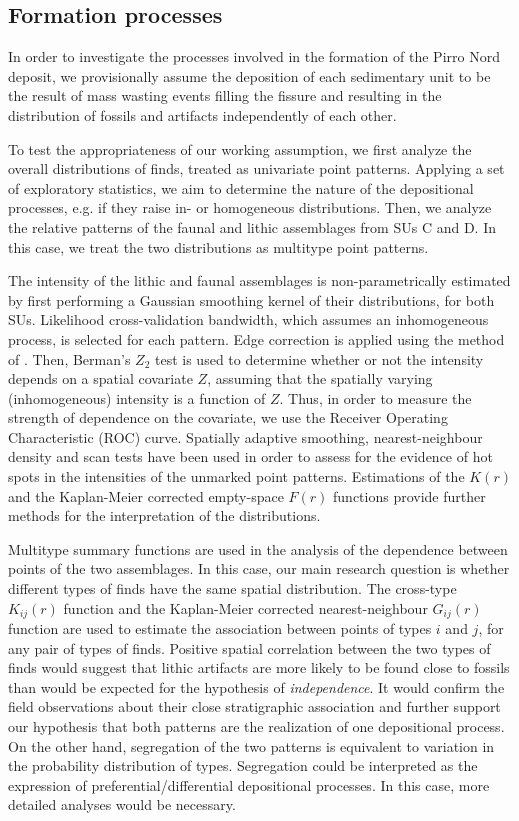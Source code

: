 \documentclass[5p,authoryear]{elsarticle} %
\begin{document}
\subsection{Formation processes}

In order to investigate the processes involved in the formation of the Pirro Nord deposit, we provisionally assume the deposition of each sedimentary unit to be the result of mass wasting events filling the fissure and resulting in the distribution of fossils and artifacts independently of each other.

To test the appropriateness of our working assumption, we first analyze the overall distributions of finds, treated as univariate point patterns. Applying a set of exploratory statistics, we aim to determine the nature of the depositional processes, e.g. if they raise in- or homogeneous distributions. Then, we analyze the relative patterns of the faunal and lithic assemblages from SUs C and D. In this case, we treat the two distributions as multitype point patterns.

The intensity of the lithic and faunal assemblages is non-parametrically estimated by first performing a Gaussian smoothing kernel of their distributions, for both SUs. Likelihood cross-validation bandwidth, which assumes an inhomogeneous process, is selected for each pattern. Edge correction is applied using the method of \cite{Diggle1985}. Then, Berman's $Z_2$ test is used to determine whether or not the intensity depends on a spatial covariate $Z$, assuming that the spatially varying (inhomogeneous) intensity is a function of $Z$. Thus, in order to measure the strength of dependence on the covariate, we use the Receiver Operating Characteristic (ROC) curve. Spatially adaptive smoothing, nearest-neighbour density and scan tests have been used in order to assess for the evidence of hot spots in the intensities of the unmarked point patterns. Estimations of the $K(r)$ and the Kaplan-Meier corrected empty-space $F(r)$ functions provide further methods for the interpretation of the distributions.

Multitype summary functions are used in the analysis of the dependence between points of the two assemblages. In this case, our main research question is whether different types of finds have the same spatial distribution. The cross-type $K_{ij}(r)$ function and the Kaplan-Meier corrected nearest-neighbour $G_{ij}(r)$ function are used to estimate the association between points of types $i$ and $j$, for any pair of types of finds. Positive spatial correlation between the two types of finds would suggest that lithic artifacts are more likely to be found close to fossils than would be expected for the hypothesis of \emph{independence}. It would confirm the field observations about their close stratigraphic association and further support our hypothesis that both patterns are the realization of one depositional process. On the other hand, segregation of the two patterns is equivalent to variation in the probability distribution of types. Segregation could be interpreted as the expression of preferential/differential depositional processes. In this case, more detailed analyses would be necessary.
\end{document}
